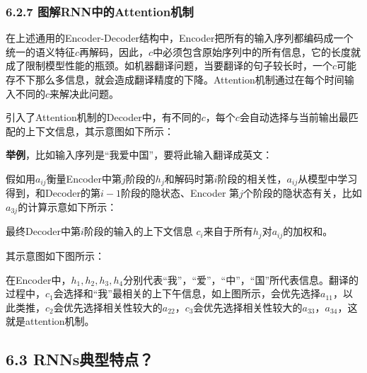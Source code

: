 \subsubsection{6.2.7
图解RNN中的Attention机制}\label{ux56feux89e3rnnux4e2dux7684attentionux673aux5236}

​
在上述通用的Encoder-Decoder结构中，Encoder把所有的输入序列都编码成一个统一的语义特征\(c​\)再解码，因此，\(c​\)中必须包含原始序列中的所有信息，它的长度就成了限制模型性能的瓶颈。如机器翻译问题，当要翻译的句子较长时，一个\(c​\)可能存不下那么多信息，就会造成翻译精度的下降。Attention机制通过在每个时间输入不同的\(c​\)来解决此问题。

​
引入了Attention机制的Decoder中，有不同的\(c\)，每个\(c​\)会自动选择与当前输出最匹配的上下文信息，其示意图如下所示：


​ \textbf{举例}，比如输入序列是``我爱中国''，要将此输入翻译成英文：

​
假如用\(a_{ij}\)衡量Encoder中第\(j\)阶段的\(h_j\)和解码时第\(i\)阶段的相关性，\(a_{ij}\)从模型中学习得到，和Decoder的第\(i-1\)阶段的隐状态、Encoder
第\(j\)个阶段的隐状态有关，比如\(a_{3j}​\)的计算示意如下所示：


最终Decoder中第\(i\)阶段的输入的上下文信息
\(c_i\)来自于所有\(h_j\)对\(a_{ij}\)的加权和。

其示意图如下图所示：


​
在Encoder中，\(h_1,h_2,h_3,h_4\)分别代表``我''，``爱''，``中''，``国''所代表信息。翻译的过程中，\(c_1\)会选择和``我''最相关的上下午信息，如上图所示，会优先选择\(a_{11}\)，以此类推，\(c_2\)会优先选择相关性较大的\(a_{22}\)，\(c_3\)会优先选择相关性较大的\(a_{33}，a_{34}\)，这就是attention机制。

\subsection{6.3 RNNs典型特点？}\label{rnnsux5178ux578bux7279ux70b9}

